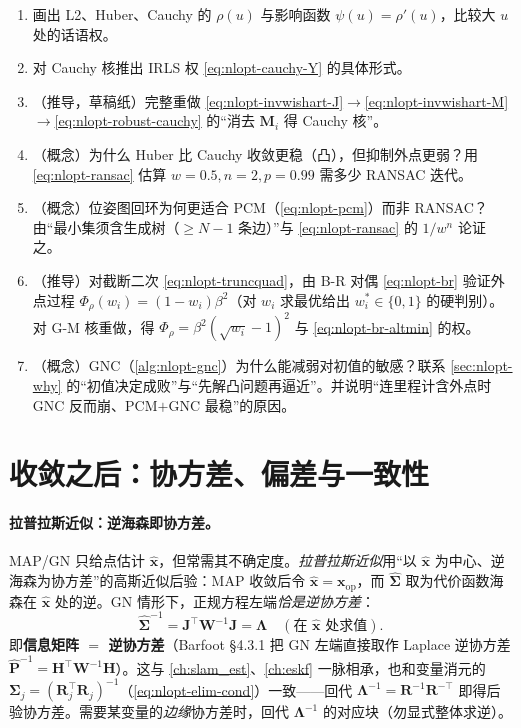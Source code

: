 \begin{practice}
\begin{enumerate}
  \item 画出 L2、Huber、Cauchy 的 $\rho(u)$ 与影响函数 $\psi(u)=\rho'(u)$，比较大 $u$ 处的话语权。
  \item 对 Cauchy 核推出 IRLS 权 \cref{eq:nlopt-cauchy-Y} 的具体形式。
  \item （推导，草稿纸）完整重做 \cref{eq:nlopt-invwishart-J}$\to$\cref{eq:nlopt-invwishart-M}$\to$\cref{eq:nlopt-robust-cauchy} 的“消去 $\mathbf{M}_i$ 得 Cauchy 核”。
  \item （概念）为什么 Huber 比 Cauchy 收敛更稳（凸），但抑制外点更弱？用 \cref{eq:nlopt-ransac} 估算 $w=0.5,n=2,p=0.99$ 需多少 RANSAC 迭代。
  \item （概念）位姿图回环为何更适合 PCM（\cref{eq:nlopt-pcm}）而非 RANSAC？由“最小集须含生成树（$\ge N-1$ 条边）”与 \cref{eq:nlopt-ransac} 的 $1/w^n$ 论证之。
  \item （推导）对截断二次 \cref{eq:nlopt-truncquad}，由 B-R 对偶 \cref{eq:nlopt-br} 验证外点过程 $\Phi_\rho(w_i)=(1-w_i)\beta^2$（对 $w_i$ 求最优给出 $w_i^*\in\{0,1\}$ 的硬判别）。对 G-M 核重做，得 $\Phi_\rho=\beta^2(\sqrt{w_i}-1)^2$ 与 \cref{eq:nlopt-br-altmin} 的权。
  \item （概念）GNC（\cref{alg:nlopt-gnc}）为什么能减弱对初值的敏感？联系 \cref{sec:nlopt-why} 的“初值决定成败”与“先解凸问题再逼近”。并说明“连里程计含外点时 GNC 反而崩、PCM$+$GNC 最稳”的原因。
\end{enumerate}
\end{practice}

\section{收敛之后：协方差、偏差与一致性}
\label{sec:nlopt-cov}

\paragraph{拉普拉斯近似：逆海森即协方差。}\cite{barfoot2024state}
MAP/GN 只给点估计 $\hat{\mathbf{x}}$，但常需其不确定度。\emph{拉普拉斯近似}用“以 $\hat{\mathbf{x}}$ 为中心、逆海森为协方差”的高斯近似后验：MAP 收敛后令 $\hat{\mathbf{x}}=\mathbf{x}_{\mathrm{op}}$，而 $\hat{\boldsymbol{\Sigma}}$ 取为代价函数海森在 $\hat{\mathbf{x}}$ 处的逆。GN 情形下，正规方程左端\emph{恰是逆协方差}：
\begin{equation}
  \hat{\boldsymbol{\Sigma}}^{-1}=\mathbf{J}^\top\mathbf{W}^{-1}\mathbf{J}=\boldsymbol{\Lambda}\quad(\text{在 }\hat{\mathbf{x}}\text{ 处求值}).
  \label{eq:laplace}
\end{equation}
即\textbf{信息矩阵 $=$ 逆协方差}（Barfoot\cite{barfoot2024state} §4.3.1 把 GN 左端直接取作 Laplace 逆协方差 $\hat{\mathbf{P}}^{-1}=\mathbf{H}^\top\mathbf{W}^{-1}\mathbf{H}$）。这与 \cref{ch:slam_est}、\cref{ch:eskf} 一脉相承，也和变量消元的 $\boldsymbol{\Sigma}_j=(\mathbf{R}_j^\top\mathbf{R}_j)^{-1}$（\cref{eq:nlopt-elim-cond}）一致——回代 $\boldsymbol{\Lambda}^{-1}=\mathbf{R}^{-1}\mathbf{R}^{-\top}$ 即得后验协方差。需要某变量的\emph{边缘}协方差时，回代 $\boldsymbol{\Lambda}^{-1}$ 的对应块（勿显式整体求逆）。


